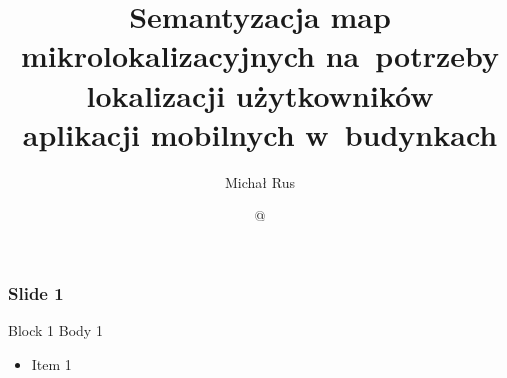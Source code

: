 \documentclass{beamer}
\title[Semantyzacja map mikrolokalizacyjnych]{Semantyzacja map mikrolokalizacyjnych na~potrzeby lokalizacji użytkowników\\aplikacji mobilnych w~budynkach}
\author[M. Rus]{Michał Rus}
\date[2015]{\gitshortrev{} @ \gitauthordate{}}
\institute[AGH]{Wydział EAIiIB\\Katedra Informatyki Stosowanej}
\begin{document}
{
	\begin{frame}
		\titlepage
	\end{frame}
}


\begin{frame}
	\frametitle{Slide 1}

	\begin{block}{Block 1}
		Body 1
	\end{block}
	
	\begin{itemize}
		\item Item 1
	\end{itemize}
\end{frame}

\end{document}

